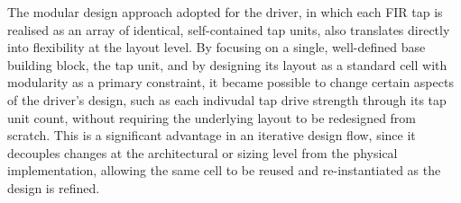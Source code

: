 The modular design approach adopted for the driver, in which each \ac{FIR} tap is realised as an array of identical, self-contained tap units, also translates directly into flexibility at the layout level. By focusing on a single, well-defined base building block, the tap unit, and by designing its layout as a standard cell with modularity as a primary constraint, it became possible to change certain aspects of the driver's design, such as each indivudal tap drive strength through its tap unit count, without requiring the underlying layout to be redesigned from scratch. This is a significant advantage in an iterative design flow, since it decouples changes at the architectural or sizing level from the physical implementation, allowing the same cell to be reused and re-instantiated as the design is refined.


